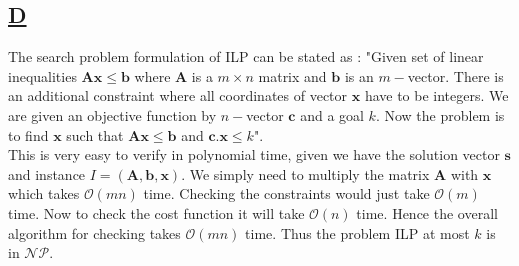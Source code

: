 \documentclass[14pt]{article}
\newcommand{\nonp}{$\mathcal{NP}$}
\begin{document}
		\subsection*{\underline{D}}
			\noindent
			\newline
			The search problem formulation of ILP can be stated as : "Given set of linear inequalities $\mathbf{Ax} \leq \mathbf{b}$ where $\mathbf{A}$ is a $m \times n$ matrix and $\mathbf{b}$ is an $m-$vector. There is an additional constraint where all coordinates of vector $\mathbf{x}$ have to be integers. We are given an objective function by $n-$vector $\mathbf{c}$ and a goal $k$. Now the problem is to find $\mathbf{x}$ such that $\mathbf{Ax} \leq \mathbf{b}$ and $\mathbf{c.x} \leq k$".\\
			\newline
			This is very easy to verify in polynomial time, given we have the solution vector $\mathbf{s}$ and instance $I = (\mathbf{A, b, x})$. We simply need to multiply the matrix $\mathbf{A}$ with $\mathbf{x}$ which takes $\mathcal{O}(mn)$ time. Checking the constraints would just take $\mathcal{O}(m)$ time. Now to check the cost function it will take $\mathcal{O}(n)$ time. Hence the overall algorithm for checking takes $\mathcal{O}(mn)$ time. Thus the problem ILP at most $k$ is in \nonp.
 	
\end{document}
